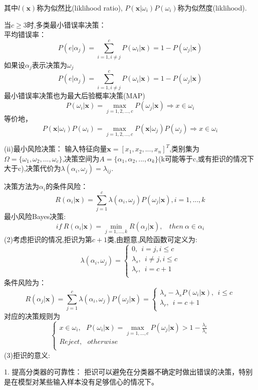\documentclass{article}
\begin{document}
其中$l(\boldsymbol{x})$称为似然比(liklihood ratio), $P(\boldsymbol{x}|\omega_i)P(\omega_i)$称为似然度(liklihood).

当$c\geq3$时,多类最小错误率决策：\\
平均错误率：\[P(e|\alpha_j)=\sum_{i=1,i\neq j}^{c}P(\omega_i|\boldsymbol{x})=1-P(\omega_j|\boldsymbol{x})\]
如果设$\alpha_j$表示决策为$\omega_j$\\
\[P(e|\alpha_j)=\sum_{i=1,i\neq j}^{c}P(\omega_i|\boldsymbol{x})=1-P(\omega_j|\boldsymbol{x})\]
最小错误率决策也为最大后验概率决策(MAP)\[P(\omega_i|\boldsymbol{x})=\max_{j=1,2,...,c}P(\omega_j|\boldsymbol{x})\Rightarrow x\in \omega_i\]
等价地，\[P(\boldsymbol{x}|\omega_i)P(\omega_i)=\max_{j=1,2,...,c}P(\boldsymbol{x}|\omega_j)P(\omega_j)\Rightarrow x\in \omega_i\]

(ii)最小风险决策：
输入特征向量$\boldsymbol{x}=[x_1,x_2,...,x_n]^{T}$,类别集为$\Omega=\{\omega_1,\omega_2,...,\omega_c\}$,决策空间为$A=\{\alpha_1,\alpha_2,...,\alpha_k\}$(k可能等于c,或有拒识的情况下大于c),决策代价为$\lambda(\alpha_i,\omega_j)=\lambda_{ij}$.

决策方法为$\alpha_i$的条件风险：
\[R(\alpha_i|\boldsymbol{x})=\sum_{j=1}^{c}\lambda(\alpha_i,\omega_j)P(\omega_j|\boldsymbol{x}),i=1,...,k\]最小风险Bayes决策:
\[if~R(\alpha_i|\boldsymbol{x})=\min_{j=1,...,k}R(\alpha_j|\boldsymbol{x}),~~~~then~\alpha\in\alpha_i\]
(2)考虑拒识的情况,拒识为第$c+1$类,由题意,风险函数可定义为:
\[\lambda(\alpha_i,\omega_j)=
\begin{cases}
    0,~~i=j,i\leq c\\
    \lambda_s,~~i\neq j,i\leq c\\
    \lambda_r,~~i=c+1\\
\end{cases}    
\]
条件风险为：
\[R(\alpha_j|\boldsymbol{x})=\sum_{j=1}^{c}\lambda(\alpha_i,\omega_j)P(\omega_j|\boldsymbol{x})=
\begin{cases}
    \lambda_s-\lambda_sP(\omega_i|\boldsymbol{x}),~~i\leq c\\
    \lambda_r,~~i=c+1\\
\end{cases}    
\]
对应的决策规则为
\[
\begin{cases}
    x\in \omega_i,~~~P(\omega_i|\boldsymbol{x})=\max_{j=1,...,c} P(\omega_j|\boldsymbol{x})>1-\frac{\lambda_r}{\lambda_s}\\
    Reject,~~~otherwise\\
\end{cases} 
\]
(3)拒识的意义:

1. 提高分类器的可靠性： 拒识可以避免在分类器不确定时做出错误的决策，特别是在模型对某些输入样本没有足够信心的情况下。
\end{document}

